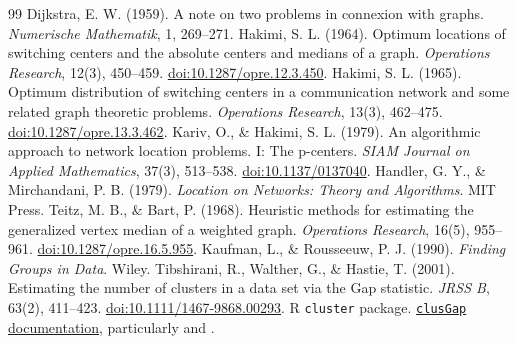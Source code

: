 \documentclass[11pt,a4paper]{article}
\newcommand{\code}[1]{\texttt{\detokenize{#1}}}
\begin{document}
\begin{thebibliography}{99}
 Dijkstra, E. W. (1959). A note on two problems in connexion with graphs. \emph{Numerische Mathematik}, 1, 269--271.
 Hakimi, S. L. (1964). Optimum locations of switching centers and the absolute centers and medians of a graph. \emph{Operations Research}, 12(3), 450--459. \href{https://doi.org/10.1287/opre.12.3.450}{doi:10.1287/opre.12.3.450}.
 Hakimi, S. L. (1965). Optimum distribution of switching centers in a communication network and some related graph theoretic problems. \emph{Operations Research}, 13(3), 462--475. \href{https://doi.org/10.1287/opre.13.3.462}{doi:10.1287/opre.13.3.462}.
 Kariv, O., \& Hakimi, S. L. (1979). An algorithmic approach to network location problems. I: The p-centers. \emph{SIAM Journal on Applied Mathematics}, 37(3), 513--538. \href{https://doi.org/10.1137/0137040}{doi:10.1137/0137040}.
 Handler, G. Y., \& Mirchandani, P. B. (1979). \emph{Location on Networks: Theory and Algorithms}. MIT Press.
 Teitz, M. B., \& Bart, P. (1968). Heuristic methods for estimating the generalized vertex median of a weighted graph. \emph{Operations Research}, 16(5), 955--961. \href{https://doi.org/10.1287/opre.16.5.955}{doi:10.1287/opre.16.5.955}.
 Kaufman, L., \& Rousseeuw, P. J. (1990). \emph{Finding Groups in Data}. Wiley.
 Tibshirani, R., Walther, G., \& Hastie, T. (2001). Estimating the number of clusters in a data set via the Gap statistic. \emph{JRSS B}, 63(2), 411--423. \href{https://doi.org/10.1111/1467-9868.00293}{doi:10.1111/1467-9868.00293}.
 R \texttt{cluster} package. \href{https://search.r-project.org/CRAN/refmans/cluster/html/clusGap.html}{\texttt{clusGap} documentation}, particularly \code{d.power} and \code{Tibs2001SEmax}.
\end{thebibliography}
\end{document}
